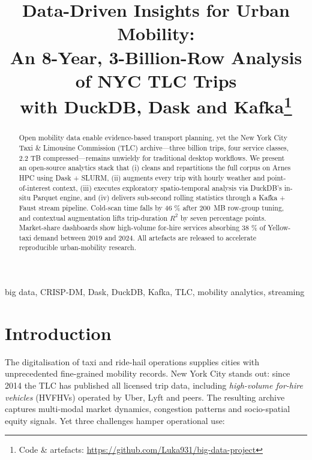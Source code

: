 \documentclass[conference]{IEEEtran}
\begin{document}
\title{Data-Driven Insights for Urban Mobility:\\
       An 8-Year, 3-Billion-Row Analysis of NYC TLC Trips\\
       with DuckDB, Dask and Kafka\thanks{Code \& artefacts:
       \url{https://github.com/Luka931/big-data-project}}}

\author{
\and
{}
}

\maketitle

\begin{abstract}
Open mobility data enable evidence-based transport planning, yet the
New York City Taxi \& Limousine Commission (TLC) archive—three billion
trips, four service classes, 2.2 TB compressed—remains unwieldy for
traditional desktop workflows.  
We present an open-source analytics stack that (i) cleans and
repartitions the full corpus on Arnes HPC using Dask + SLURM,
(ii) augments every trip with hourly weather and point-of-interest
context, (iii) executes exploratory spatio-temporal analysis via
DuckDB’s in-situ Parquet engine, and (iv) delivers sub-second rolling
statistics through a Kafka + Faust stream pipeline.
Cold-scan time falls by 46 \% after \SI{200}{MB} row-group tuning, and
contextual augmentation lifts trip-duration \(R^{2}\) by seven
percentage points.  
Market-share dashboards show high-volume for-hire services absorbing
38 \% of Yellow-taxi demand between 2019 and 2024.  
All artefacts are released to accelerate reproducible
urban-mobility research.
\end{abstract}

\begin{IEEEkeywords}
big data, CRISP-DM, Dask, DuckDB, Kafka, TLC, mobility analytics,
streaming
\end{IEEEkeywords}

\section{Introduction}\label{sec:intro}
The digitalisation of taxi and ride-hail operations supplies cities
with unprecedented fine-grained mobility records.  
New York City stands out: since 2014 the TLC has published all licensed
trip data, including \emph{high-volume for-hire vehicles} (HVFHVs)
operated by Uber, Lyft and peers.  
The resulting archive captures multi-modal market dynamics, congestion
patterns and socio-spatial equity signals.  
Yet three challenges hamper operational use:
\end{document}
